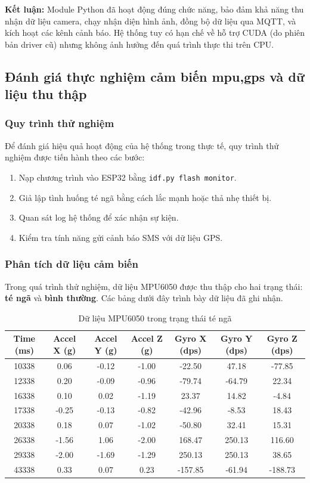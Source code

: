 \textbf{Kết luận:} Module Python đã hoạt động đúng chức năng, bảo đảm khả năng thu nhận dữ liệu camera, chạy nhận diện hình ảnh, đồng bộ dữ liệu qua MQTT, và kích hoạt các kênh cảnh báo. Hệ thống tuy có hạn chế về hỗ trợ CUDA (do phiên bản driver cũ) nhưng không ảnh hưởng đến quá trình thực thi trên CPU.

\subsection{Đánh giá thực nghiệm cảm biến mpu,gps và dữ liệu thu thập}
\subsubsection*{Quy trình thử nghiệm}
Để đánh giá hiệu quả hoạt động của hệ thống trong thực tế, quy trình thử nghiệm được tiến hành theo các bước:
\begin{enumerate}
    \item Nạp chương trình vào ESP32 bằng \texttt{idf.py flash monitor}.  
    \item Giả lập tình huống té ngã bằng cách lắc mạnh hoặc thả nhẹ thiết bị.  
    \item Quan sát log hệ thống để xác nhận sự kiện.  
    \item Kiểm tra tính năng gửi cảnh báo SMS với dữ liệu GPS.  
\end{enumerate}

\subsubsection*{Phân tích dữ liệu cảm biến}
Trong quá trình thử nghiệm, dữ liệu MPU6050 được thu thập cho hai trạng thái: \textbf{té ngã} và \textbf{bình thường}.  
Các bảng dưới đây trình bày dữ liệu đã ghi nhận.


\begin{table}[H]
\centering
\caption{Dữ liệu MPU6050 trong trạng thái té ngã}
\label{tab:fall_log_data}
\begin{tabular}{|c|c|c|c|c|c|c|}
\hline
\textbf{Time (ms)} & \textbf{Accel X (g)} & \textbf{Accel Y (g)} & \textbf{Accel Z (g)} & \textbf{Gyro X (dps)} & \textbf{Gyro Y (dps)} & \textbf{Gyro Z (dps)} \\
\hline
10338 & 0.06 & -0.12 & -1.00 & -22.50 & 47.18 & -77.85 \\
12338 & 0.20 & -0.09 & -0.96 & -79.74 & -64.79 & 22.34 \\
16338 & 0.10 & 0.02  & -1.19 & 23.37  & 14.82  & -4.84 \\
17338 & -0.25 & -0.13 & -0.82 & -42.96 & -8.53  & 18.43 \\
20338 & 0.18 & 0.07  & -1.02 & -50.80 & 32.41  & 15.31 \\
26338 & -1.56 & 1.06  & -2.00 & 168.47 & 250.13 & 116.60 \\
29338 & -2.00 & -1.69 & -1.29 & 250.13 & 250.13 & 38.65 \\
43338 & 0.33 & 0.07  & 0.23  & -157.85 & -61.94 & -188.73 \\
\hline
\end{tabular}
\end{table}


